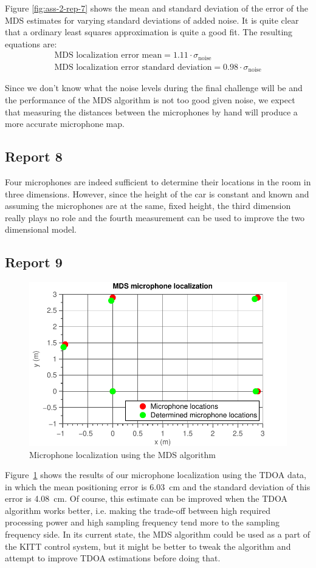 \documentclass[11pt,titlepage]{report}
\begin{document}
Figure \ref{fig:ass-2-rep-7} shows the mean and standard deviation of the error of the MDS estimates for varying standard deviations of added noise. It is quite clear that a ordinary least squares approximation is quite a good fit. The resulting equations are:
\begin{align*}
\text{MDS localization error mean} = 1.11\cdot\sigma_{\text{noise}} \\
\text{MDS localization error standard deviation} = 0.98\cdot\sigma_{\text{noise}}
\end{align*}

Since we don't know what the noise levels during the final challenge will be and the performance of the MDS algorithm is not too good given noise, we expect that measuring the distances between the microphones by hand will produce a more accurate microphone map.
\subsection{Report 8}
Four microphones are indeed sufficient to determine their locations in the room in three dimensions. However, since the height of the car is constant and known and assuming the microphones are at the same, fixed height, the third dimension really plays no role and the fourth measurement can be used to improve the two dimensional model.

\subsection{Report 9}
\label{subsec:ass-2-rep-9}
\begin{figure}[H]
	\begin{center}
		\includegraphics[width=.8\linewidth]{../../deliverable-7-resources/figures/ass-2/report-9/ass-2-report-9.pdf}
	\end{center}
	\caption{Microphone localization using the MDS algorithm}
	\label{fig:ass-2-rep-9}
\end{figure}
Figure~\ref{fig:ass-2-rep-9} shows the results of our microphone localization using the TDOA data, in which the mean positioning error is \SI{6.03}{\centi\meter} and the standard deviation of this error is \SI{4.08}{\centi\meter}. Of course, this estimate can be improved when the TDOA algorithm works better, i.e. making the trade-off between high required processing power and high sampling frequency tend more to the sampling frequency side. In its current state, the MDS algorithm could be used as a part of the KITT control system, but it might be better to tweak the algorithm and attempt to improve TDOA estimations before doing that.
\end{document}

